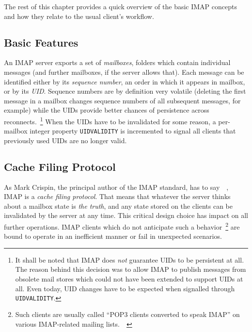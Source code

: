 \documentclass[trojita]{subfiles}
\begin{document}
The rest of this chapter provides a quick overview of the basic IMAP concepts and how they relate to the usual client's
workflow.

\subsection{Basic Features}

An IMAP server exports a set of {\em mailboxes}, folders which contain individual messages (and further mailboxes, if
the server allows that).  Each message can be identified either by its {\em sequence number}, an order in which it
appears in mailbox, or by its {\em UID}.  Sequence numbers are by definition very volatile (deleting the first message
in a mailbox changes sequence numbers of all subsequent messages, for example) while the UIDs provide better chances of
persistence across reconnects.~\footnote{It shall be noted that IMAP does {\em not} guarantee UIDs to be persistent at
all.  The reason behind this decision was to allow IMAP to publish messages from obsolete mail stores which could not
have been extended to support UIDs at all.  Even today, UID changes have to be expected when signalled through {\tt
UIDVALIDITY}.} When the UIDs have to be invalidated for some reason, a per-mailbox integer property {\tt UIDVALIDITY}
is incremented to signal all clients that previously used UIDs are no longer valid.

\subsection{Cache Filing Protocol}

As Mark Crispin, the principal author of the IMAP standard, has to
say~\cite{crispin-imap-cache-filing-1}~\cite{crispin-imap-cache-filing-2}, IMAP is a {\em cache filing protocol}.  That
means that whatever the server thinks about a mailbox state is {\em the truth}, and any state stored on the clients can
be invalidated by the server at any time.  This critical design choice has impact on all further operations.  IMAP
clients which do not anticipate such a behavior~\footnote{Such clients are usually called ``POP3 clients converted to
speak IMAP'' on various IMAP-related mailing
lists.~\cite{shannon-imap-clients-glorified-pop}~\cite{crispin-imap-clients-glorified-pop}} are bound to operate in an
inefficient manner or fail in unexpected scenarios.
\end{document}
